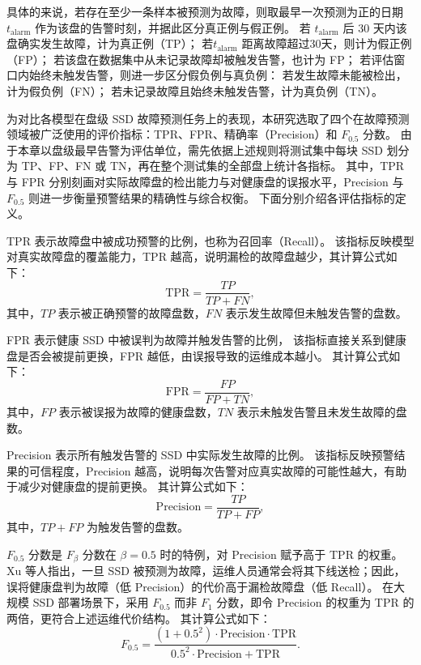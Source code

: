 具体的来说，若存在至少一条样本被预测为故障，则取最早一次预测为正的日期 $t_{\mathrm{alarm}}$ 作为该盘的告警时刻，并据此区分真正例与假正例。
若 $t_{\mathrm{alarm}}$ 后 30 天内该盘确实发生故障，计为真正例（TP）；
若$t_{\mathrm{alarm}}$  距离故障超过30天，则计为假正例（FP）；
若该盘在数据集中从未记录故障却被触发告警，也计为 FP；
若评估窗口内始终未触发告警，则进一步区分假负例与真负例：
若发生故障未能被检出，计为假负例（FN）；
若未记录故障且始终未触发告警，计为真负例（TN）。

为对比各模型在盘级 SSD 故障预测任务上的表现，本研究选取了四个在故障预测领域被广泛使用的评价指标：TPR、FPR、精确率（Precision）和 $F_{0.5}$ 分数。
由于本章以盘级最早告警为评估单位，需先依据上述规则将测试集中每块 SSD 划分为 TP、FP、FN 或 TN，再在整个测试集的全部盘上统计各指标。
其中，TPR 与 FPR 分别刻画对实际故障盘的检出能力与对健康盘的误报水平，Precision 与 $F_{0.5}$ 则进一步衡量预警结果的精确性与综合权衡。
下面分别介绍各评估指标的定义。

TPR 表示故障盘中被成功预警的比例，也称为召回率（Recall）。
该指标反映模型对真实故障盘的覆盖能力，TPR 越高，说明漏检的故障盘越少，其计算公式如下：
\begin{equation}
    \mathrm{TPR} = \frac{TP}{TP+FN},
\end{equation}
其中，$TP$ 表示被正确预警的故障盘数，$FN$ 表示发生故障但未触发告警的盘数。

FPR 表示健康 SSD 中被误判为故障并触发告警的比例，
该指标直接关系到健康盘是否会被提前更换，FPR 越低，由误报导致的运维成本越小。
其计算公式如下：
\begin{equation}
    \mathrm{FPR} = \frac{FP}{FP+TN},
\end{equation}
其中，$FP$ 表示被误报为故障的健康盘数，$TN$ 表示未触发告警且未发生故障的盘数。

Precision 表示所有触发告警的 SSD 中实际发生故障的比例。
该指标反映预警结果的可信程度，Precision 越高，说明每次告警对应真实故障的可能性越大，有助于减少对健康盘的提前更换。
其计算公式如下：
\begin{equation}
    \mathrm{Precision} = \frac{TP}{TP+FP},
\end{equation}
其中，$TP+FP$ 为触发告警的盘数。

$F_{0.5}$ 分数是 $F_{\beta}$ 分数在 $\beta=0.5$ 时的特例，对 Precision 赋予高于 TPR 的权重。
Xu 等人\cite{xu2021general}指出，一旦 SSD 被预测为故障，运维人员通常会将其下线送检；因此，误将健康盘判为故障（低 Precision）的代价高于漏检故障盘（低 Recall）。
在大规模 SSD 部署场景下，采用 $F_{0.5}$ 而非 $F_1$ 分数，即令 Precision 的权重为 TPR 的两倍，更符合上述运维代价结构。
其计算公式如下：
\begin{equation}
    F_{0.5} = \frac{(1+0.5^2) \cdot \mathrm{Precision} \cdot \mathrm{TPR}}{0.5^2 \cdot \mathrm{Precision} + \mathrm{TPR}}.
\end{equation}


